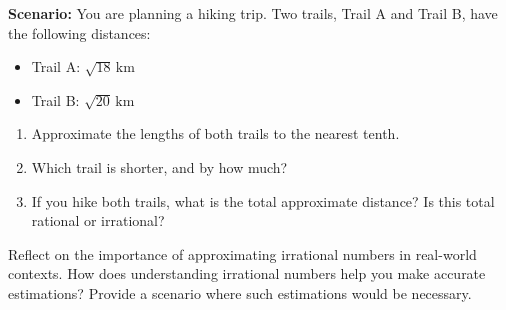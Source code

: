 \documentclass[12pt]{article}
\begin{document}
\vspace{1em}

\begin{tcolorbox}[colframe=black!60, colback=white, 
coltitle=black, colbacktitle=black!15, fonttitle=\bfseries\Large, 
title=Performance Task: Comparing Routes, halign title=center, left=10pt, right=10pt, top=10pt, bottom=50pt]
\textbf{Scenario:} You are planning a hiking trip. Two trails, Trail A and Trail B, have the following distances:
\begin{itemize}
    \item Trail A: \( \sqrt{18} \, \text{km} \)
    \item Trail B: \( \sqrt{20} \, \text{km} \)
\end{itemize}
\begin{enumerate}[itemsep=3em]
    \item Approximate the lengths of both trails to the nearest tenth.
    \item Which trail is shorter, and by how much?
    \item If you hike both trails, what is the total approximate distance? Is this total rational or irrational?
\end{enumerate}
\end{tcolorbox}

\vspace{1em}

\begin{tcolorbox}[colframe=black!60, colback=white, 
coltitle=black, colbacktitle=black!15, fonttitle=\bfseries\Large, 
title=Reflection, halign title=center, left=10pt, right=10pt, top=10pt, bottom=80pt]
Reflect on the importance of approximating irrational numbers in real-world contexts. How does understanding irrational numbers help you make accurate estimations? Provide a scenario where such estimations would be necessary.
\end{tcolorbox}
\end{document}
